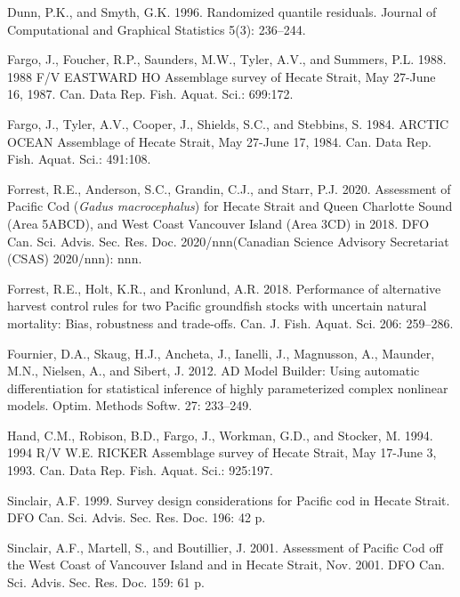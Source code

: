 \documentclass[11pt]{book}
\begin{document}
\leavevmode\hypertarget{ref-dunn1996}{}%
Dunn, P.K., and Smyth, G.K. 1996. Randomized quantile residuals. Journal of Computational and Graphical Statistics 5(3): 236--244.

\leavevmode\hypertarget{ref-fargo1988}{}%
Fargo, J., Foucher, R.P., Saunders, M.W., Tyler, A.V., and Summers, P.L. 1988. 1988 F/V EASTWARD HO Assemblage survey of Hecate Strait, May 27-June 16, 1987. Can. Data Rep. Fish. Aquat. Sci.: 699:172.

\leavevmode\hypertarget{ref-fargo1984}{}%
Fargo, J., Tyler, A.V., Cooper, J., Shields, S.C., and Stebbins, S. 1984. ARCTIC OCEAN Assemblage of Hecate Strait, May 27-June 17, 1984. Can. Data Rep. Fish. Aquat. Sci.: 491:108.

\leavevmode\hypertarget{ref-forrest2020}{}%
Forrest, R.E., Anderson, S.C., Grandin, C.J., and Starr, P.J. 2020. Assessment of Pacific Cod (\emph{Gadus macrocephalus}) for Hecate Strait and Queen Charlotte Sound (Area 5ABCD), and West Coast Vancouver Island (Area 3CD) in 2018. DFO Can. Sci. Advis. Sec. Res. Doc. 2020/nnn(Canadian Science Advisory Secretariat (CSAS) 2020/nnn): nnn.

\leavevmode\hypertarget{ref-forrest2018}{}%
Forrest, R.E., Holt, K.R., and Kronlund, A.R. 2018. Performance of alternative harvest control rules for two Pacific groundfish stocks with uncertain natural mortality: Bias, robustness and trade-offs. Can. J. Fish. Aquat. Sci. 206: 259--286.

\leavevmode\hypertarget{ref-fournier2012}{}%
Fournier, D.A., Skaug, H.J., Ancheta, J., Ianelli, J., Magnusson, A., Maunder, M.N., Nielsen, A., and Sibert, J. 2012. AD Model Builder: Using automatic differentiation for statistical inference of highly parameterized complex nonlinear models. Optim. Methods Softw. 27: 233--249.

\leavevmode\hypertarget{ref-hand1994}{}%
Hand, C.M., Robison, B.D., Fargo, J., Workman, G.D., and Stocker, M. 1994. 1994 R/V W.E. RICKER Assemblage survey of Hecate Strait, May 17-June 3, 1993. Can. Data Rep. Fish. Aquat. Sci.: 925:197.

\leavevmode\hypertarget{ref-sinclair2000}{}%
Sinclair, A.F. 1999. Survey design considerations for Pacific cod in Hecate Strait. DFO Can. Sci. Advis. Sec. Res. Doc. 196: 42 p.

\leavevmode\hypertarget{ref-sinclair2001}{}%
Sinclair, A.F., Martell, S., and Boutillier, J. 2001. Assessment of Pacific Cod off the West Coast of Vancouver Island and in Hecate Strait, Nov. 2001. DFO Can. Sci. Advis. Sec. Res. Doc. 159: 61 p.
\end{document}
